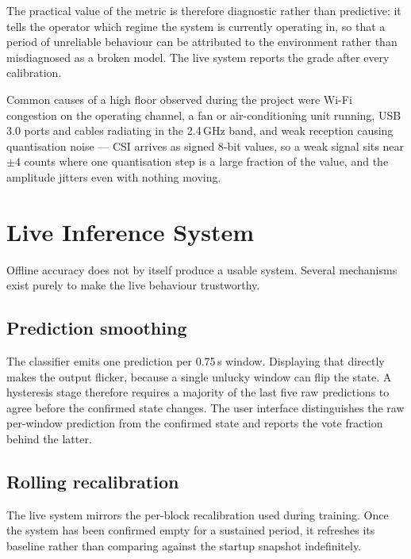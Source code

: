 \documentclass[11pt,a4paper]{article}
\begin{document}
\noindent
The practical value of the metric is therefore diagnostic rather than
predictive: it tells the operator which regime the system is currently
operating in, so that a period of unreliable behaviour can be attributed to the
environment rather than misdiagnosed as a broken model. The live system reports
the grade after every calibration.

Common causes of a high floor observed during the project were Wi-Fi congestion
on the operating channel, a fan or air-conditioning unit running, USB\,3.0 ports
and cables radiating in the 2.4\,GHz band, and weak reception causing
quantisation noise --- CSI arrives as signed 8-bit values, so a weak signal sits
near $\pm 4$ counts where one quantisation step is a large fraction of the
value, and the amplitude jitters even with nothing moving.

\section{Live Inference System}

Offline accuracy does not by itself produce a usable system. Several mechanisms
exist purely to make the live behaviour trustworthy.

\subsection{Prediction smoothing}

The classifier emits one prediction per 0.75\,s window. Displaying that
directly makes the output flicker, because a single unlucky window can flip the
state. A hysteresis stage therefore requires a majority of the last five raw
predictions to agree before the confirmed state changes. The user interface
distinguishes the raw per-window prediction from the confirmed state and
reports the vote fraction behind the latter.

\subsection{Rolling recalibration}

The live system mirrors the per-block recalibration used during training. Once
the system has been confirmed empty for a sustained period, it refreshes its
baseline rather than comparing against the startup snapshot indefinitely.
\end{document}
